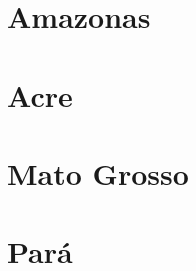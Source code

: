 \documentclass[8pt]{beamer}
\begin{document}
\section{Amazonas}

\begin{frame}[label=amzamcod2dig]{}
\textit{\hyperlink{indice_principal}{}}

\end{frame}

\begin{frame}[label=amzamcnae2dig]{}
\textit{\hyperlink{indice_principal}{}}

\end{frame}

\section{Acre}


\begin{frame}[label=amzaccod2dig]{}
\textit{\hyperlink{indice_principal}{}}

\end{frame}

\begin{frame}[label=amzaccnae2dig]{}
\textit{\hyperlink{indice_principal}{}}

\end{frame}

\section{Mato Grosso}

\begin{frame}[label=amzmtcod2dig]{}
\textit{\hyperlink{indice_principal}{}}

\end{frame}

\begin{frame}[label=amzmtcnae2dig]{}
\textit{\hyperlink{indice_principal}{}}

\end{frame}

\section{Pará}

\begin{frame}[label=amzpacod2dig]{}
\textit{\hyperlink{indice_principal}{}}

\end{frame}
\end{document}
